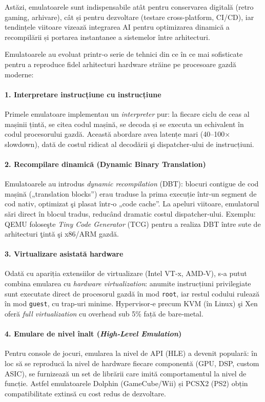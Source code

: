 \documentclass[titlepage,12pt]{article}
\begin{document}
Astăzi, emulatoarele sunt indispensabile atât pentru conservarea digitală (retro gaming, arhivare), cât și pentru dezvoltare (testare cross-platform, CI/CD), iar tendințele viitoare vizează integrarea AI pentru optimizarea dinamică a recompilării și portarea instantanee a sistemelor între arhitecturi.

Emulatoarele au evoluat printr‑o serie de tehnici din ce în ce mai sofisticate pentru a reproduce fidel arhitecturi hardware străine pe procesoare gazdă moderne:

\paragraph{1. Interpretare instrucțiune cu instrucțiune}  
Primele emulatoare implementau un \emph{interpreter} pur: la fiecare ciclu de ceas al mașinii țintă, se citea codul mașină, se decoda și se executa un echivalent în codul procesorului gazdă. Această abordare avea latențe mari (40–100× slowdown), dată de costul ridicat al decodării şi dispatcher‑ului de instrucțiuni.

\paragraph{2. Recompilare dinamică (Dynamic Binary Translation)}  
Emulatoarele au introdus \emph{dynamic recompilation} (DBT): blocuri contigue de cod mașină („translation blocks”) erau traduse la prima execuție într‑un segment de cod nativ, optimizat şi plasat într‑o „code cache”. La apeluri viitoare, emulatorul sări direct în blocul tradus, reducând dramatic costul dispatcher‑ului. Exemplu: QEMU foloseşte \emph{Tiny Code Generator} (TCG) pentru a realiza DBT între sute de arhitecturi ţintă şi x86/\-ARM gazdă.

\paragraph{3. Virtualizare asistată hardware}  
Odată cu apariția extensiilor de virtualizare (Intel VT‑x, AMD‑V), s‑a putut combina emularea cu \emph{hardware virtualization}: anumite instrucțiuni privilegiate sunt executate direct de procesorul gazdă în mod \texttt{root}, iar restul codului rulează în mod \texttt{guest}, cu trap‑uri minime. Hypervisor‑e precum KVM (în Linux) şi Xen oferă \emph{full virtualization} cu overhead sub 5\% față de bare‑metal.

\paragraph{4. Emulare de nivel înalt (\emph{High‑Level Emulation})}  
Pentru console de jocuri, emularea la nivel de API (HLE) a devenit populară: în loc să se reproducă la nivel de hardware fiecare componentă (GPU, DSP, custom ASIC), se furnizează un set de librării care imită comportamentul la nivel de funcție. Astfel emulatoarele Dolphin (GameCube/Wii) și PCSX2 (PS2) obțin compatibilitate extinsă cu cost redus de dezvoltare.
\end{document}
